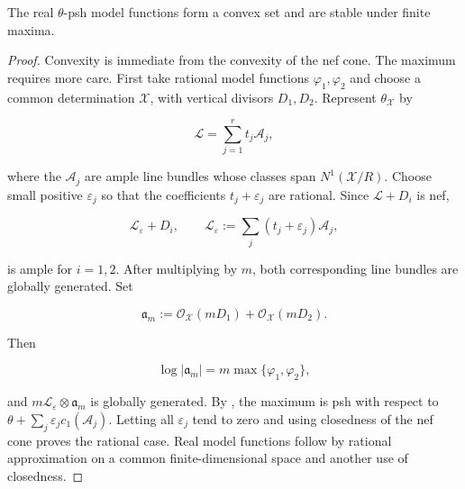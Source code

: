 \begin{proposition}\label{prop:ch20-model-max}
The real \(\theta\)-psh model functions form a convex set and are stable
under finite maxima.
\end{proposition}

\begin{proof}
Convexity is immediate from the convexity of the nef cone.  The maximum
requires more care.  First take rational model functions
\(\varphi_1,\varphi_2\) and choose a common determination
\(\mathcal X\), with vertical divisors \(D_1,D_2\).  Represent
\(\theta_{\mathcal X}\) by

\begin{equation}
\label{eq:ch20-ample-basis}
                    \mathcal L=\sum_{j=1}^r t_j\mathcal A_j,
\end{equation}

where the \(\mathcal A_j\) are ample line bundles whose classes span
\(N^1(\mathcal X/R)\).  Choose small positive \(\varepsilon_j\) so that
the coefficients \(t_j+\varepsilon_j\) are rational.  Since
\(\mathcal L+D_i\) is nef,

\begin{equation}
\label{eq:ch20-ample-perturbation}
              \mathcal L_\varepsilon+D_i,
              \qquad
              \mathcal L_\varepsilon
                :=\sum_j(t_j+\varepsilon_j)\mathcal A_j,
\end{equation}

is ample for \(i=1,2\).  After multiplying by \(m\), both corresponding
line bundles are globally generated.  Set

\begin{equation}
\label{eq:ch20-max-ideal}
 \mathfrak a_m
   :=\mathcal O_{\mathcal X}(mD_1)
       +\mathcal O_{\mathcal X}(mD_2).
\end{equation}

Then

\begin{equation}
\label{eq:ch20-max-ideal-function}
             \log|\mathfrak a_m|
                  =m\max\{\varphi_1,\varphi_2\},
\end{equation}

and \(m\mathcal L_\varepsilon\otimes\mathfrak a_m\) is globally
generated.  By , the maximum is psh with
respect to
\(\theta+\sum_j\varepsilon_jc_1(\mathcal A_j)\).  Letting all
\(\varepsilon_j\) tend to zero and using closedness of the nef cone proves
the rational case.  Real model functions follow by rational approximation
on a common finite-dimensional space and another use of closedness.
\end{proof}

